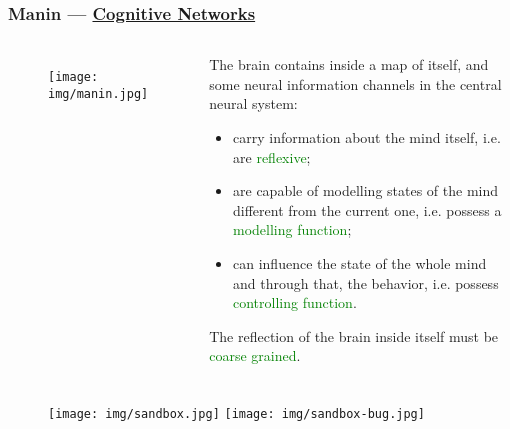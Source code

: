 \documentclass[UTF8,11pt,colorlinks,compress,openany]{beamer}%
\begin{document}
\begin{frame}\frametitle{Manin --- \href{https://arxiv.org/abs/1709.03114}{Cognitive Networks}}
\begin{columns}
\begin{figure}[H]
\texttt{[image: img/manin.jpg]}
\end{figure}
\begin{block}{}
The brain contains inside a map of itself, and some neural information channels in the central neural system:
\begin{itemize}
	\item carry information about the mind itself, i.e. are \textcolor{green}{reflexive};
	\item are capable of modelling states of the mind different from the current one, i.e. possess a \textcolor{green}{modelling function};
	\item can influence the state of the whole mind and through that, the behavior, i.e. possess \textcolor{green}{controlling function}.
\end{itemize}
The reflection of the brain inside itself must be \textcolor{green}{coarse grained}.
\end{block}
\end{columns}
\end{frame}

\begin{frame}\frametitle{}
\begin{figure}[H]
\texttt{[image: img/sandbox.jpg]}
\texttt{[image: img/sandbox-bug.jpg]}
\end{figure}
\end{frame}
\end{document}
